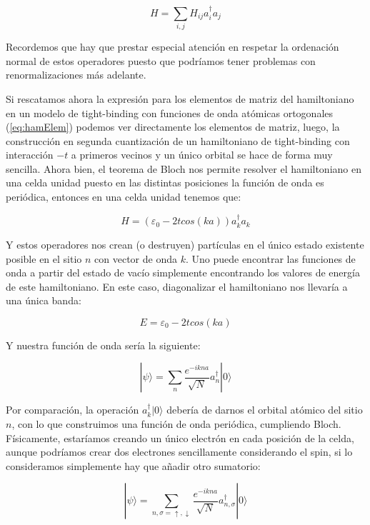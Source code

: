 \documentclass{article} %
\begin{document}
\begin{equation}
H = \sum_{i, j} H_{ij} a_i^{\dagger} a_j
\end{equation}

Recordemos que hay que prestar especial atención en respetar la ordenación normal de estos operadores puesto que podríamos tener problemas con renormalizaciones más adelante.

Si rescatamos ahora la expresión para los elementos de matriz del hamiltoniano en un modelo de tight-binding con funciones de onda atómicas ortogonales (\ref{eq:hamElem}) podemos ver directamente los elementos de matriz, luego, la construcción en segunda cuantización de un hamiltoniano de tight-binding con interacción $-t$ a primeros vecinos y un único orbital se hace de forma muy sencilla. Ahora bien, el teorema de Bloch nos permite resolver el hamiltoniano en una celda unidad puesto en las distintas posiciones la función de onda es periódica, entonces en una celda unidad tenemos que:

\begin{equation}
H = \left(\varepsilon_0 - 2tcos(ka)\right)a_k^{\dagger} a_k
\end{equation}

Y estos operadores nos crean (o destruyen) partículas en el único estado existente posible en el sitio $n$ con vector de onda $k$. Uno puede encontrar las funciones de onda a partir del estado de vacío simplemente encontrando los valores de energía de este hamiltoniano. En este caso, diagonalizar el hamiltoniano nos llevaría a una única banda:

\begin{equation}
E = \varepsilon_0 - 2tcos(ka)
\end{equation}

Y nuestra función de onda sería la siguiente:

\begin{equation}
|\psi\rangle = \sum_n \frac{e^{-ikna}}{\sqrt{N}}a_n^{\dagger}|0\rangle
\end{equation}

Por comparación, la operación $a_k^{\dagger}|0\rangle$ debería de darnos el orbital atómico del sitio $n$, con lo que construimos una función de onda periódica, cumpliendo Bloch. Físicamente, estaríamos creando un único electrón en cada posición de la celda, aunque podríamos crear dos electrones sencillamente considerando el spin, si lo consideramos simplemente hay que añadir otro sumatorio:

\begin{equation}
|\psi\rangle = \sum_{n, \sigma=\uparrow, \downarrow} \frac{e^{-ikna}}{\sqrt{N}}a_{n, \sigma}^{\dagger}|0\rangle
\end{equation}
\end{document}
